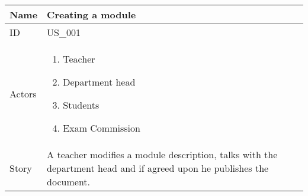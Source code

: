 \documentclass{article}
\newcommand\addrow[2]{#1 &#2\\ }
\newcommand\tabularhead{\begin{tabular}{lp{8cm}}
		\hline
	}
\newcommand\addmulrow[2]{ \begin{minipage}[t][][t]{2.5cm}#1\end{minipage}%
		&\begin{minipage}[t][][t]{8cm}
			\begin{enumerate} #2   \end{enumerate}
		\end{minipage}\\ }
\newenvironment{usecase}{\tabularhead}
	{\hline\end{tabular}}
\begin{document}
	\begin{usecase}
		\addrow{Name}{Creating a module}
		\hline
		\addrow{ID}{US\_001}
		\hline
 		\addmulrow{Actors}{	\item Teacher 
							\item Department head 
							\item Students
							\item Exam Commission}
		\hline		
		\addrow{Story}{A teacher modifies a module description, talks with the department head and if agreed upon he publishes the document.}
								

	\end{usecase}
	
\end{document}

